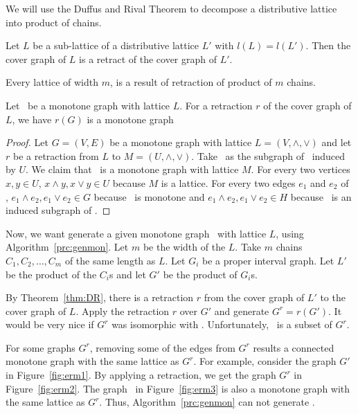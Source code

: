 We will use the Duffus and Rival Theorem to decompose a distributive lattice into 
product of chains.

\begin{theorem}  \label{thm:DR}
Let \(L\) be a sub-lattice of a distributive lattice \(L'\) with
\(l(L)=l(L')\)\@. Then the cover graph of \(L\) is a retract of the cover graph of 
\(L'\)\@.
\end{theorem}

\begin{cor}
Every lattice of width \(m\), is a result of retraction of product of
\(m\) chains.
\end{cor}

\begin{lemma} \label{lem:retract}
Let \mG\ be a monotone graph with lattice \(L\)\@.
For a retraction \(r\) of the cover graph of \(L\), we have \(r(G)\) is a monotone graph
\end{lemma}

\begin{proof}
Let \(G=(V,E)\) be a monotone graph with lattice \(L=(V, \wedge,\vee)\) and
let \(r\) be a retraction from \(L\) to \(M =(U, \wedge, \vee)\)\@.
Take \mH\ as the subgraph of \mG\ induced by \(U\)\@.
We claim that \mH\ is a monotone graph with lattice \(M\)\@.
For every two vertices \(x,y\in U\), 
\(x\wedge y,x\vee y\in U\) because \(M\) is a lattice. For every two edges \(e_1\) and \(e_2\) of
\mH, \(e_1\wedge e_2,e_1\vee e_2\in G\) because  \mG\ is monotone and
\(e_1\wedge e_2,e_1\vee e_2\in H\) because \mH\ is an induced subgraph of \mG\@. 
\end{proof}

Now, we want generate a given monotone graph \mG\ with lattice \(L\),
using Algorithm~\ref{prc:genmon}. Let \(m\) be the width of the \(L\)\@.
Take \(m\) chains \(C_1,C_2,\dotsc,C_m\) of the same length as \(L\)\@.
Let \(G_i\) be a proper interval graph. 
Let \(L'\) be the product of the \(C_i\)s and let \(G'\) be the product of \(G_i\)s.

By Theorem~\ref{thm:DR}, there is a retraction \(r\) from the cover graph of \(L'\) to the cover graph of \(L\)\@.
Apply the retraction \(r\) over \(G'\) and generate \(G^r = r(G')\)\@.
It would be very nice if \(G^r\) was isomorphic with \mG\@. Unfortunately, \mG\ is a subset of \(G^r\)\@.

For some graphs \(G^r\), removing some of the edges from \(G^r\) results a connected 
monotone graph with the same lattice as \(G^r\)\@.
For example, consider the graph \(G'\) in
Figure~\ref{fig:erm1}\@. By applying a retraction, we get the
graph \(G^r\) in Figure~\ref{fig:erm2}\@. The graph
\mG\ in Figure~\ref{fig:erm3} is also a monotone graph with the same lattice 
as \(G^r\)\@. Thus, Algorithm~\ref{prc:genmon} can not generate \mG\@. 

